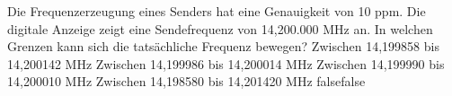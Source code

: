     {Die Frequenzerzeugung eines Senders hat eine Genauigkeit von 10 ppm. Die digitale Anzeige zeigt eine Sendefrequenz von 14,200.000 MHz an. In welchen Grenzen kann sich die tatsächliche Frequenz bewegen?}
    {Zwischen 14,199858 bis 14,200142 MHz}
    {Zwischen 14,199986 bis 14,200014 MHz}
    {Zwischen 14,199990 bis 14,200010 MHz}
    {Zwischen 14,198580 bis 14,201420 MHz}
    {false}{false}